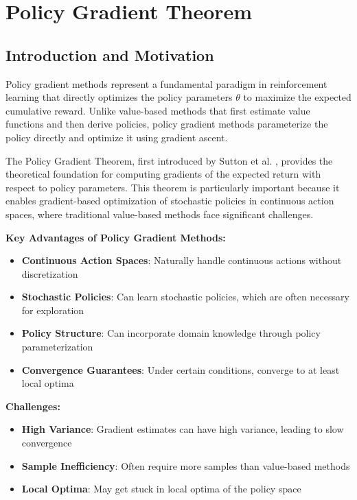 \section{Policy Gradient Theorem}

\subsection{Introduction and Motivation}

Policy gradient methods represent a fundamental paradigm in reinforcement learning that directly optimizes the policy parameters $\theta$ to maximize the expected cumulative reward. Unlike value-based methods that first estimate value functions and then derive policies, policy gradient methods parameterize the policy directly and optimize it using gradient ascent.

The Policy Gradient Theorem, first introduced by Sutton et al. \cite{sutton2000policy}, provides the theoretical foundation for computing gradients of the expected return with respect to policy parameters. This theorem is particularly important because it enables gradient-based optimization of stochastic policies in continuous action spaces, where traditional value-based methods face significant challenges.

\textbf{Key Advantages of Policy Gradient Methods:}
\begin{itemize}
    \item \textbf{Continuous Action Spaces}: Naturally handle continuous actions without discretization
    \item \textbf{Stochastic Policies}: Can learn stochastic policies, which are often necessary for exploration
    \item \textbf{Policy Structure}: Can incorporate domain knowledge through policy parameterization
    \item \textbf{Convergence Guarantees}: Under certain conditions, converge to at least local optima
\end{itemize}

\textbf{Challenges:}
\begin{itemize}
    \item \textbf{High Variance}: Gradient estimates can have high variance, leading to slow convergence
    \item \textbf{Sample Inefficiency}: Often require more samples than value-based methods
    \item \textbf{Local Optima}: May get stuck in local optima of the policy space
\end{itemize}

